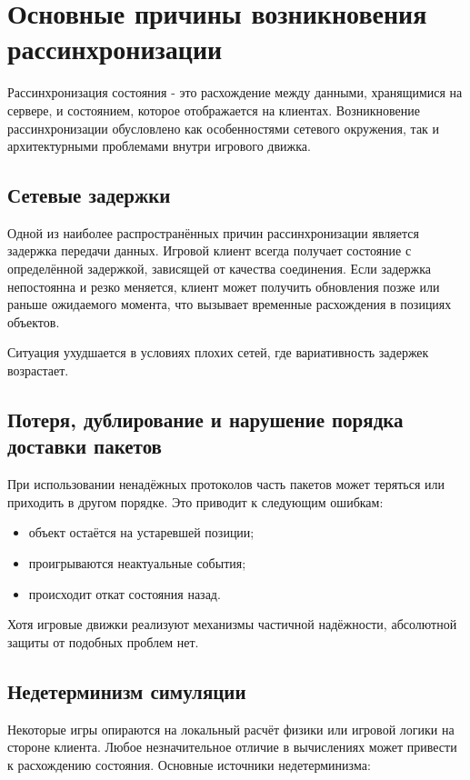 \chapter{Основные причины возникновения рассинхронизации}

Рассинхронизация состояния - это расхождение между данными, хранящимися на сервере, и состоянием,
которое отображается на клиентах. Возникновение рассинхронизации обусловлено как особенностями сетевого
окружения, так и архитектурными проблемами внутри игрового движка.

\section{Сетевые задержки}

Одной из наиболее распространённых причин рассинхронизации является задержка передачи данных\cite{pantel2002lag}.
Игровой клиент всегда получает состояние с определённой задержкой, зависящей от качества соединения.
Если задержка непостоянна и резко меняется, клиент может получить обновления позже или раньше
ожидаемого момента, что вызывает временные расхождения в позициях объектов.

Ситуация ухудшается в условиях плохих сетей, где вариативность задержек возрастает.

\section{Потеря, дублирование и нарушение порядка доставки пакетов}

При использовании ненадёжных протоколов часть пакетов может теряться или приходить в другом порядке.
Это приводит к следующим ошибкам:

\begin{itemize}
    \item объект остаётся на устаревшей позиции;
    \item проигрываются неактуальные события;
    \item происходит откат состояния назад.
\end{itemize}

Хотя игровые движки реализуют механизмы частичной надёжности, абсолютной защиты от подобных проблем нет.

\section{Недетерминизм симуляции}

Некоторые игры опираются на локальный расчёт физики или игровой логики на стороне клиента. Любое незначительное
отличие в вычислениях может привести к расхождению состояния. Основные источники недетерминизма:


